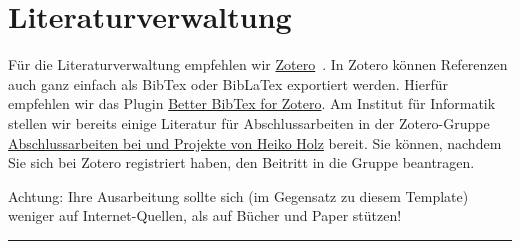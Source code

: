 \section{Literaturverwaltung}

Für die Literaturverwaltung empfehlen wir \href{https://www.zotero.org/}{Zotero}~\cite{zotero}. In Zotero können Referenzen auch ganz einfach als BibTex oder BibLaTex exportiert werden. Hierfür empfehlen wir das Plugin \href{https://github.com/retorquere/zotero-better-bibtex}{Better BibTex for Zotero}. Am Institut für Informatik stellen wir bereits einige Literatur für Abschlussarbeiten in der Zotero-Gruppe \href{https://www.zotero.org/groups/5530859/}{
Abschlussarbeiten bei und Projekte von Heiko Holz} bereit. Sie können, nachdem Sie sich bei Zotero registriert haben, den Beitritt in die Gruppe beantragen.

Achtung: Ihre Ausarbeitung sollte sich (im Gegensatz zu diesem Template) weniger auf Internet-Quellen, als auf Bücher und Paper stützen!
\\

\hfil\rule{0.4\textwidth}{0.4pt}

\Blindtext[5]

